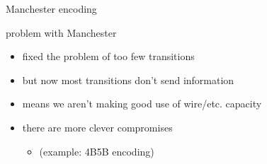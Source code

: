 

\begin{frame}{Manchester encoding}
\end{frame}

\begin{frame}{problem with Manchester}
    \begin{itemize}
    \item fixed the problem of too few transitions
    \vspace{.5cm}
    \item but now most transitions don't send information
    \item means we aren't making good use of wire/etc. capacity
    \vspace{.5cm}
    \item there are more clever compromises
        \begin{itemize}
        \item (example: 4B5B encoding)
        \end{itemize}
    \end{itemize}
\end{frame}
